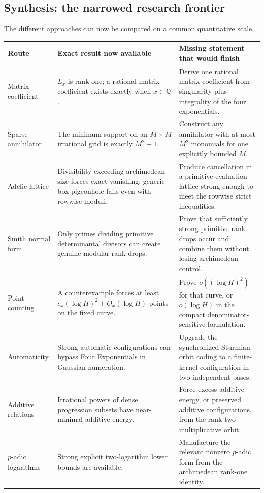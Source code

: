 \documentclass[11pt,oneside]{article}
\theoremstyle{definition}
\theoremstyle{remark}
\newcommand{\Q}{\mathbb Q}
\begin{document}
\subsection{Synthesis: the narrowed research frontier}
\label{sec:sparse-synthesis}

The different approaches can now be compared on a common quantitative scale.

\begin{center}
\small
\begin{tabularx}{0.98\textwidth}{@{}p{}X X@{}}
\toprule
\textbf{Route} & \textbf{Exact result now available} & \textbf{Missing statement that would finish} \\
\midrule
Matrix coefficient
& $L_x$ is rank one; a rational matrix coefficient exists exactly when $x\in\Q$.
& Derive one rational matrix coefficient from singularity plus integrality of the four exponentials. \\
\addlinespace
Sparse annihilator
& The minimum support on an $M\times M$ irrational grid is exactly $M^2+1$.
& Construct any annihilator with at most $M^2$ monomials for one explicitly bounded $M$. \\
\addlinespace
Adelic lattice
& Divisibility exceeding archimedean size forces exact vanishing; generic box pigeonhole fails even with rowwise moduli.
& Produce cancellation in a primitive evaluation lattice strong enough to meet the rowwise strict inequalities. \\
\addlinespace
Smith normal form
& Only primes dividing primitive determinantal divisors can create genuine modular rank drops.
& Prove that sufficiently strong primitive rank drops occur and combine them without losing archimedean control. \\
\addlinespace
Point counting
& A counterexample forces at least $c_x(\log H)^2+O_x(\log H)$ points on the fixed curve.
& Prove $o((\log H)^2)$ for that curve, or $o(\log H)$ in the compact denominator-sensitive formulation. \\
\addlinespace
Automaticity
& Strong automatic configurations can bypass Four Exponentials in Gaussian numeration.
& Upgrade the synchronized Sturmian orbit coding to a finite-kernel configuration in two independent bases. \\
\addlinespace
Additive relations
& Irrational powers of dense progression subsets have near-minimal additive energy.
& Force excess additive energy, or preserved additive configurations, from the rank-two multiplicative orbit. \\
\addlinespace
$p$-adic logarithms
& Strong explicit two-logarithm lower bounds are available.
& Manufacture the relevant nonzero $p$-adic form from the archimedean rank-one identity. \\
\bottomrule
\end{tabularx}
\end{center}
\end{document}
